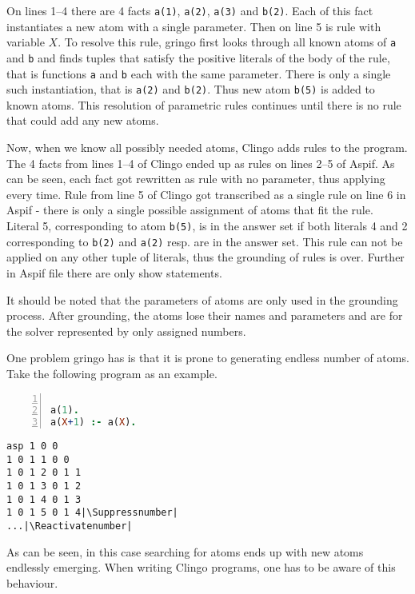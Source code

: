 \documentclass[
    digital,
    color,
    oneside,
    sansbold,
    lot,
    nolof
]{fithesis}
\begin{document}
On lines 1--4 there are 4 facts \texttt{a(1)}, \texttt{a(2)}, \texttt{a(3)} and
\texttt{b(2)}. Each of this fact instantiates
a new atom with a single parameter. Then on line 5 is
rule with variable $X$. To resolve this rule, gringo first looks through
all known atoms of \texttt{a} and \texttt{b} and finds tuples that satisfy
the positive literals of the body of the rule, that is functions \texttt{a}
and \texttt{b} each with the same parameter. There is only a single such
instantiation, that is \texttt{a(2)} and \texttt{b(2)}. Thus new atom
\texttt{b(5)} is added to known atoms. This resolution of parametric rules
continues until there is no rule that could add any new atoms.

Now, when we know all possibly needed atoms, Clingo adds rules to the program.
The 4 facts from lines 1--4 of Clingo ended up as
rules on lines 2--5 of Aspif. As can be seen,
each fact got rewritten as rule with no parameter, thus applying every time.
Rule from line 5 of Clingo got transcribed as a single rule on line 6 in Aspif
- there is only a single possible assignment of atoms that fit the rule.
Literal 5, corresponding to atom \texttt{b(5)}, is in the answer set
if both literals 4 and 2 corresponding to \texttt{b(2)} and \texttt{a(2)} resp.
are in the answer set. This rule can not be applied on any other tuple of
literals, thus the grounding of rules is over. Further in Aspif file there are
only show statements.

It should be noted that the parameters of atoms are only used in the grounding
process. After grounding, the atoms lose their names and parameters and are
for the solver represented by only assigned numbers.

One problem gringo has is that it is prone to generating endless number
of atoms. Take the following program as an example.

\begin{minipage}[t]{0.45\linewidth}
\centering
\begin{lstlisting}[language=prolog, numbers=left, countblanklines=false]

a(1).
a(X+1) :- a(X).
\end{lstlisting}
\end{minipage}
\hspace{1em}
\begin{minipage}[t]{0.45\linewidth}
\centering
\begin{lstlisting}[numbers=right, countblanklines=false]
asp 1 0 0
1 0 1 1 0 0
1 0 1 2 0 1 1
1 0 1 3 0 1 2
1 0 1 4 0 1 3
1 0 1 5 0 1 4|\Suppressnumber|
...|\Reactivatenumber|
\end{lstlisting}
\end{minipage}
As can be seen, in this case searching for atoms ends up with new atoms
endlessly emerging. When writing Clingo programs, one has to be aware of this
behaviour.
\end{document}
